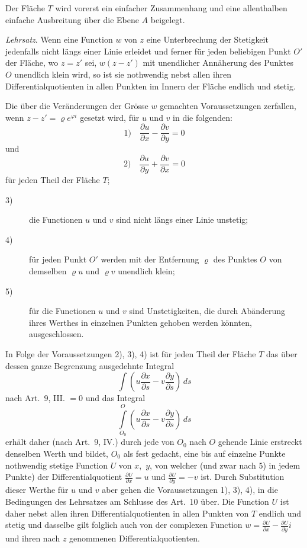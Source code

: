 \documentclass[a4paper,12pt]{article}
\begin{document}
Der Fl\"{a}che $T$ wird vorerst ein einfacher Zusammenhang und eine
allenthalben einfache Ausbreitung \"{u}ber die Ebene $A$
beigelegt.

\emph{Lehrsatz}.  Wenn eine Function $w$ von $z$ eine
Unterbrechung der Stetigkeit jedenfalls nicht l\"{a}ngs einer
Linie erleidet und ferner f\"{u}r jeden beliebigen Punkt $O'$ der
Fl\"{a}che, wo $z = z'$ sei, $w(z - z')$ mit unendlicher
Ann\"{a}herung des Punktes~$O$ unendlich klein wird, so ist sie
nothwendig nebst allen ihren Differentialquotienten in allen
Punkten im Innern der Fl\"{a}che endlich und stetig.

Die \"{u}ber die Ver\"{a}nderungen der Gr\"{o}sse $w$ gemachten
Voraussetzungen zerfallen, wenn
$z - z' = \varrho e^{\varphi i}$
gesetzt wird, f\"{u}r $u$ und $v$ in die folgenden:
\[ \mbox{1)}\quad
   \frac{\partial u}{\partial x} - \frac{\partial v}{\partial y}
      = 0 \]
und
\[ \mbox{2)}\quad
   \frac{\partial u}{\partial y} + \frac{\partial v}{\partial x}
      = 0 \]
f\"{u}r jeden Theil der Fl\"{a}che $T$;
\begin{description}
\item[\textmd{3)}]
die Functionen $u$ und $v$ sind nicht l\"{a}ngs einer Linie
unstetig;
\item[\textmd{4)}]
f\"{u}r jeden Punkt $O'$ werden mit der Entfernung $\varrho$ des
Punktes $O$ von demselben $\varrho u$ und $\varrho v$ unendlich
klein;
\item[\textmd{5)}]
f\"{u}r die Functionen $u$ und $v$ sind Unstetigkeiten, die durch
Ab\"{a}nderung ihres Werthes in einzelnen Punkten gehoben werden
k\"{o}nnten, ausgeschlossen.
\end{description}

In Folge der Voraussetzungen 2), 3), 4) ist f\"{u}r jeden Theil
der Fl\"{a}che $T$ das \"{u}ber dessen ganze Begrenzung
ausgedehnte Integral
\[ \int  \left(
            u \frac{\partial x}{\partial s}
          - v \frac{\partial y}{\partial s}
         \right) \, ds \]
nach Art.~9, III. $= 0$ und das Integral
\[ \int\limits_{O_0}^O
         \left(
            u \frac{\partial x}{\partial s}
          - v \frac{\partial y}{\partial s}
         \right) \, ds \]
erh\"{a}lt daher (nach Art.~9, IV.) durch jede von $O_0$ nach $O$
gehende Linie erstreckt denselben Werth und bildet, $O_0$ als
fest gedacht, eine bis auf einzelne Punkte nothwendig stetige
Function $U$ von $x$,~$y$, von welcher (und zwar nach 5) in jedem
Punkte) der Differentialquotient
$\displaystyle \frac{\partial U}{\partial x} = u$
und
$\displaystyle \frac{\partial U}{\partial y} = - v$
ist.  Durch Substitution dieser Werthe f\"{u}r $u$ und $v$ aber
gehen die Voraussetzungen 1), 3), 4), in die Bedingungen des
Lehrsatzes am Schlusse des Art.~10 \"{u}ber.  Die Function $U$ ist
daher nebst allen ihren Differentialquotienten in allen Punkten
von $T$ endlich und stetig und dasselbe gilt folglich auch von
der complexen Function
$\displaystyle w
   =  \frac{\partial U}{\partial x} - \frac{\partial U}{\partial y} i$
und ihren nach $z$ genommenen Differentialquotienten.
\end{document}
